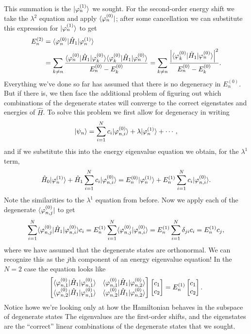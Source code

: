 \documentclass[../p116main.tex]{subfiles}
\begin{document}
This summation is the $|{\varphi_n^{(1)}}\rangle$ we sought.
For the second-order energy shift we take the $\lambda^2$ equation and apply $\langle{\varphi_n^{(0)}}|$; after some cancellation we can substitute this expression for $|{\varphi_n^{(1)}}\rangle$ to get
\begin{align*}
    E_n^{(2)} &= \langle{\varphi_n^{(0)}}| \hat H_1 |{\varphi_n^{(1)}}\rangle \\
    &= \sum_{k \neq n}^{} \frac{\langle{\varphi_n^{(0)}}| \hat H_1 |{\varphi_k^{(0)}}\rangle \langle{\varphi_k^{(0)}}| \hat H_1 |{\varphi_n^{(0)}}\rangle}{E_n^{(0)} - E_k^{(0)}} = \sum_{k \neq n}^{} \frac{\left| \langle{\varphi_k^{(0)}}| \hat H_1 |{\varphi_n^{(0)}}\rangle \right|^2}{E_n^{(0)} - E_k^{(0)}}.
\end{align*}
Everything we've done so far has assumed that there is no degeneracy in $E_n^{(0)}$.
But if there is, we then face the additional problem of figuring out which combinations of the degenerate states will converge to the correct eigenstates and energies of $\hat H$.
To solve this problem we first allow for degeneracy in writing
\[ |{\psi_n}\rangle = \sum_{i=1}^{N} c_i |{\varphi_{n,i}^{(0)}}\rangle + \lambda |{\varphi_n^{(1)}}\rangle + \cdots, \]
and if we substitute this into the energy eigenvalue equation we obtain, for the $\lambda^{1}$ term,
\[ \hat H_0 |{\varphi_n^{(1)}}\rangle + \hat H_1 \sum_{i=1}^{N} c_i |{\varphi_{n,i}^{(0)}}\rangle = E_n^{(0)} |{\varphi_n^{(1)}}\rangle + E_n^{(1)} \sum_{i=1}^{N} c_i |{\varphi_{n,i}^{(0)}}\rangle. \]
Note the similarities to the $\lambda^{1}$ equation from before.
Now we apply each of the degenerate $\langle{\varphi_{n,j}^{(0)}}|$ to get
\[ \sum_{i=1}^{N} \langle{\varphi_{n,j}^{(0)}}| \hat H_1 |{\varphi_{n,i}^{(0)}}\rangle c_i = E_n^{(1)} \sum_{i=1}^{N} \langle{\varphi_{n,j}^{(0)}}|{\varphi_{n,i}^{(0)}}\rangle = E_n^{(1)} \sum_{i=1}^{N} \delta_{ji} c_i = E_n^{(1)} c_j, \]
where we have assumed that the degenerate states are orthonormal.
We can recognize this as the $j$th component of an energy eigenvalue equation!
In the $N=2$ case the equation looks like
\[ \begin{bmatrix} \langle{\varphi_{n,1}^{(0)}}| \hat H_1 |{\varphi_{n,1}^{(0)}}\rangle & \langle{\varphi_{n,1}^{(0)}}| \hat H_1 |{\varphi_{n,2}^{(0)}}\rangle \\ \langle{\varphi_{n,2}^{(0)}}| \hat H_1 |{\varphi_{n,1}^{(0)}}\rangle & \langle{\varphi_{n,2}^{(0)}}| \hat H_1 |{\varphi_{n,2}^{(0)}}\rangle \end{bmatrix} \begin{bmatrix} c_1 \\ c_2 \end{bmatrix} = E_n^{(1)} \begin{bmatrix} c_1 \\ c_2 \end{bmatrix}. \]
Notice howe we're looking only at how the Hamiltonian behaves in the subspace of degenerate states
The eigenvalues are the first-order shifts, and the eigenstates are the ``correct'' linear combinations of the degenerate states that we sought.
\end{document}
